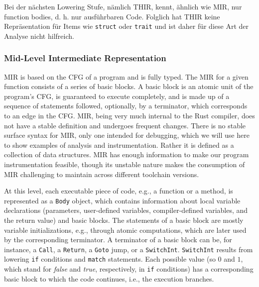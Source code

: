 \documentclass{article}
\begin{document}
Bei der nächsten Lowering Stufe, nämlich \ac{THIR}, kennt, ähnlich wie \ac{MIR}, nur function bodies, d. h. nur ausführbaren Code. Folglich hat \ac{THIR} keine Repräsentation für Items wie \lstinline{struct} oder
\lstinline{trait} und ist daher für diese Art der Analyse nicht hilfreich.


\subsubsection{Mid-Level Intermediate Representation}
\ac{MIR} is based on the \ac{CFG} of a program and is fully typed. The \ac{MIR} for a given function consists of a series of basic blocks. A basic block is an atomic unit of the program's \ac{CFG}, is guaranteed to execute completely, and is made up of a sequence of statements followed, optionally, by a terminator, which corresponds to an edge in the \ac{CFG}. \ac{MIR}, being very much internal to the Rust compiler, does not have a stable definition and undergoes frequent changes. There is no stable surface syntax for \ac{MIR}, only one intended for debugging, which we will use here to show examples of analysis and instrumentation. Rather it is defined as a collection of data structures. \ac{MIR} has enough information to make our program instrumentation feasible, though its unstable nature makes the consumption of \ac{MIR} challenging to maintain across different toolchain versions.

At this level, each executable piece of code, e.g., a function or a method, is represented as a \lstinline{Body} object, which contains information about local variable declarations (parameters, user-defined variables, compiler-defined variables, and the return value) and basic blocks. The statements of a basic block are mostly variable initializations, e.g., through atomic computations, which are later used by the corresponding terminator. A terminator of a basic block can be,  for instance, a \lstinline{Call}, a \lstinline{Return}, a \lstinline{Goto} jump, or a \lstinline{SwitchInt}. \lstinline{SwitchInt} results from lowering \lstinline{if} conditions and \lstinline{match} statements. Each possible value (so $0$ and $1$, which stand for \textit{false} and \textit{true}, respectively, in \lstinline{if} conditions) has a corresponding basic block to which the code continues, i.e., the execution branches.
\end{document}
